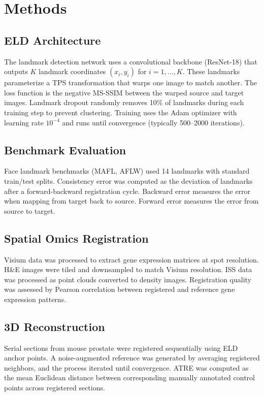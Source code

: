 \documentclass[11pt]{article}
\begin{document}
\section{Methods}

\subsection{ELD Architecture}

The landmark detection network uses a convolutional backbone (ResNet-18) that outputs $K$ landmark coordinates $(x_i, y_i)$ for $i = 1, \ldots, K$. These landmarks parameterize a TPS transformation that warps one image to match another. The loss function is the negative MS-SSIM between the warped source and target images. Landmark dropout randomly removes 10\% of landmarks during each training step to prevent clustering. Training uses the Adam optimizer with learning rate $10^{-4}$ and runs until convergence (typically 500--2000 iterations).

\subsection{Benchmark Evaluation}

Face landmark benchmarks (MAFL, AFLW) used 14 landmarks with standard train/test splits. Consistency error was computed as the deviation of landmarks after a forward-backward registration cycle. Backward error measures the error when mapping from target back to source. Forward error measures the error from source to target.

\subsection{Spatial Omics Registration}

Visium data was processed to extract gene expression matrices at spot resolution. H\&E images were tiled and downsampled to match Visium resolution. ISS data was processed as point clouds converted to density images. Registration quality was assessed by Pearson correlation between registered and reference gene expression patterns.

\subsection{3D Reconstruction}

Serial sections from mouse prostate were registered sequentially using ELD anchor points. A noise-augmented reference was generated by averaging registered neighbors, and the process iterated until convergence. ATRE was computed as the mean Euclidean distance between corresponding manually annotated control points across registered sections.
\end{document}

